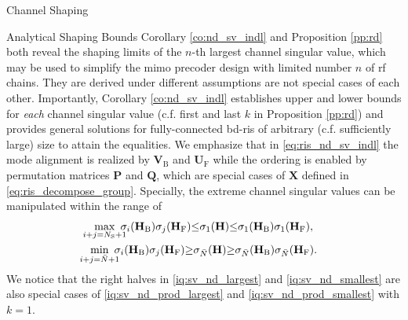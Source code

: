 \documentclass[journal]{IEEEtran}
\begin{document}
\begin{section}{Channel Shaping}
\begin{subsection}{Analytical Shaping Bounds}
		Corollary \ref{co:nd_sv_indl} and Proposition \ref{pp:rd} both reveal the shaping limits of the $n$-th largest channel singular value, which may be used to simplify the \gls{mimo} precoder design with limited number $n$ of \gls{rf} chains.
		They are derived under different assumptions are not special cases of each other.
		Importantly, Corollary \ref{co:nd_sv_indl} establishes upper and lower bounds for \emph{each} channel singular value (c.f. first and last $k$ in Proposition \ref{pp:rd}) and provides general solutions for fully-connected \gls{bd}-\gls{ris} of arbitrary (c.f. sufficiently large) size to attain the equalities.
		We emphasize that in \eqref{eq:ris_nd_sv_indl} the mode alignment is realized by $\mathbf{V}_\mathrm{B}$ and $\mathbf{U}_\mathrm{F}$ while the ordering is enabled by permutation matrices $\mathbf{P}$ and $\mathbf{Q}$, which are special cases of $\mathbf{X}$ defined in \eqref{eq:ris_decompose_group}.
		Specially, the extreme channel singular values can be manipulated within the range of
		\begin{subequations}
			\label{iq:sv_nd_extreme}
			\begin{gather}
				\max_{\mathclap{i+j=N_\mathrm{S}+1}} \ \sigma_i(\mathbf{H}_\mathrm{B}) \sigma_j(\mathbf{H}_\mathrm{F}) {\le} \sigma_1(\mathbf{H}) {\le} \sigma_1(\mathbf{H}_\mathrm{B}) \sigma_1(\mathbf{H}_\mathrm{F}), \label{iq:sv_nd_largest} \\
				\min_{\mathclap{i+j=\bar{N}+1}} \ \sigma_i(\mathbf{H}_\mathrm{B}) \sigma_j(\mathbf{H}_\mathrm{F}) {\ge} \sigma_{\bar{N}}(\mathbf{H}) {\ge} \sigma_{\bar{N}}(\mathbf{H}_\mathrm{B}) \sigma_{\bar{N}}(\mathbf{H}_\mathrm{F}). \label{iq:sv_nd_smallest}
			\end{gather}
		\end{subequations}
		We notice that the right halves in \eqref{iq:sv_nd_largest} and \eqref{iq:sv_nd_smallest} are also special cases of \eqref{iq:sv_nd_prod_largest} and \eqref{iq:sv_nd_prod_smallest} with $k=1$.


\end{subsection}
\end{section}
\end{document}
